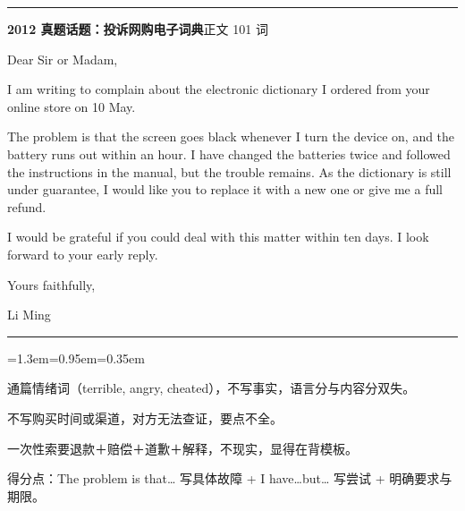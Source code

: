 \documentclass[10pt,a4paper]{ctexart}
\begin{document}
{\color{rule}\rule{\linewidth}{0.6pt}}\par\nopagebreak
\vspace{1pt}
\vspace{2pt}\noindent\colorbox{soft}{\parbox{\dimexpr\linewidth-2\fboxsep\relax}{%
\vspace{2pt}
{\footnotesize\bfseries\color{accent}2012 真题话题：投诉网购电子词典}\hfill{\footnotesize\color{gray}正文 101 词}
\par\vspace{2pt}
\footnotesize Dear Sir or Madam,\par
\footnotesize I am writing to complain about the electronic dictionary I ordered from your online store on 10 May.\par
\footnotesize The problem is that the screen goes black whenever I turn the device on, and the battery runs out within an hour. I have changed the batteries twice and followed the instructions in the manual, but the trouble remains. As the dictionary is still under guarantee, I would like you to replace it with a new one or give me a full refund.\par
\footnotesize I would be grateful if you could deal with this matter within ten days. I look forward to your early reply.\par
\footnotesize Yours faithfully,\par
\footnotesize Li Ming\par
\par{}
\par\vspace{1pt}}}\par
\vspace{2pt}
\vspace{4pt}\par\nopagebreak
{\color{rule}\rule{\linewidth}{0.6pt}}\par\nopagebreak
\vspace{1pt}
\vspace{1pt}\begingroup\setlength{\parindent}{0pt}
\begin{list}{}{\leftmargin=1.3em=0.95em=0.35em\itemindent=0pt\topsep=0pt\partopsep=0pt\parsep=1.5pt\itemsep=0pt}
\item[{\color{warn}\scriptsize$\blacksquare$}]{\footnotesize 通篇情绪词（terrible, angry, cheated），不写事实，语言分与内容分双失。}
\item[{\color{warn}\scriptsize$\blacksquare$}]{\footnotesize 不写购买时间或渠道，对方无法查证，要点不全。}
\item[{\color{warn}\scriptsize$\blacksquare$}]{\footnotesize 一次性索要退款＋赔偿＋道歉＋解释，不现实，显得在背模板。}
\item[{\color{warn}\scriptsize$\blacksquare$}]{\footnotesize 得分点：The problem is that… 写具体故障 + I have…but… 写尝试 + 明确要求与期限。}
\end{list}
\end{document}
